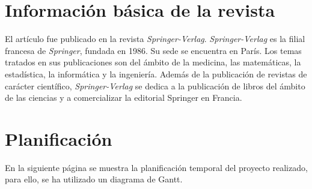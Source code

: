 \documentclass[a4paper,11pt]{report}
\begin{document}
\section{Información básica de la revista}\label{revista}

El artículo fue publicado en la revista \emph{Springer-Verlag}\cite{Springer-Verlag}. \emph{Springer-Verlag} es la filial francesa de \emph{Springer}, fundada en 1986. Su sede se encuentra en París. Los temas tratados en sus publicaciones son del ámbito de la medicina, las matemáticas, la estadística, la informática y la ingeniería. Además de la publicación de revistas de carácter científico, \emph{Springer-Verlag} se dedica a la publicación de libros del ámbito de las ciencias y a comercializar la editorial Springer en Francia. 


\section{Planificación} \label{planificacion}

En la siguiente página se muestra la planificación temporal del proyecto realizado, para ello, se ha utilizado un diagrama de Gantt.
\end{document}
